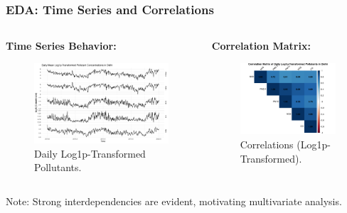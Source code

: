 \documentclass[svgnames, 12pt]{beamer}
\begin{document}
\begin{frame}
    \frametitle{EDA: Time Series and Correlations}
    \begin{columns}[T] %
        \begin{column}{0.5\textwidth}
            \textbf{Time Series Behavior:}
            \begin{figure}
                \includegraphics[width=\linewidth]{../analysis/assets/daily_ts_delhi.png}
                \caption*{Daily Log1p-Transformed Pollutants.}
            \end{figure}
        \end{column}
        \begin{column}{0.5\textwidth}
            \textbf{Correlation Matrix:}
            \begin{figure}
                \includegraphics[width=0.9\linewidth]{../analysis/assets/corrplot_delhi.png}
                \caption*{Correlations (Log1p-Transformed).}
            \end{figure}
        \end{column}
    \end{columns}
    \footnotesize Note: Strong interdependencies are evident, motivating multivariate analysis.
\end{frame}
\end{document}
